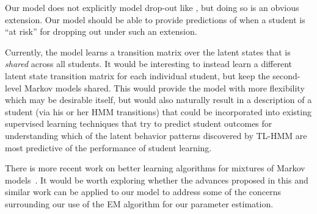 Our model does not explicitly model drop-out like
\citet{Kizilcec:2013:LAK}, but doing so is an obvious extension. Our model
should be able to provide predictions of when a student is ``at risk'' for
dropping out under such an extension.

Currently, the model learns a transition matrix over the latent states that
is \emph{shared} across all students. It would be interesting to instead
learn a different latent state transition matrix for each individual
student, but keep the second-level Markov models shared. This would provide
the model with more flexibility which may be desirable itself, but would
also naturally result in a description of a student (via his or her HMM
transitions) that could be incorporated into existing supervised learning
techniques that try to predict student outcomes for understanding
which of the latent behavior patterns discovered by TL-HMM are most predictive
of the performance of student learning. 

There is more recent work on better learning algorithms for mixtures of
Markov models~\citep{Gupta:2016:NIPS}. It would be worth exploring whether
the advances proposed in this and similar work can be applied to our model
to address some of the concerns surrounding our use of the EM algorithm for
our parameter estimation.
